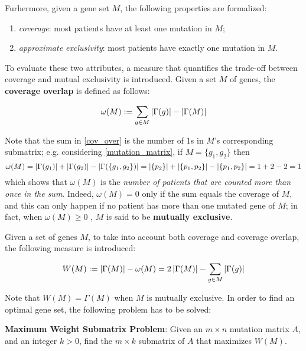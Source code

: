 Furhermore, given a gene set $M$, the following properties are formalized:

\begin{enumerate}[label=\roman*), font=\itshape]
    \item \textit{coverage}: most patients have at least one mutation in $M$;
    \item \textit{approximate exclusivity}: most patients have exactly one mutation in $M$.
\end{enumerate}

To evaluate these two attributes, a measure that quantifies the trade-off between coverage and mutual exclusivity is introduced. Given a set $M$ of genes, the \textbf{coverage overlap} is defined as follows:

\begin{equation}\label{cov_over}
    \omega(M) := \sum_{g \in M}{\left|\Gamma(g)\right|} - \left|\Gamma(M)\right|
\end{equation}

Note that the sum in \cref{cov_over} is the number of 1s in $M$'s corresponding submatrix; e.g. considering \cref{mutation_matrix}, if $M=\{g_1, g_2\}$ then $$\omega(M)=\left|\Gamma(g_1)\right| + \left|\Gamma(g_2)\right| - \left|\Gamma(\{g_1, g_2\})\right| = \left|\{p_2\}\right| + \left|\{p_1, p_2\}\right| - \left|\{p_1, p_2\}\right| = 1 + 2 - 2 = 1$$ which shows that $\omega(M)$ is the \textit{number of patients that are counted more than once in the sum}. Indeed, $\omega(M) = 0$ only if the sum equals the coverage of $M$, and this can only happen if no patient has more than one mutated gene of $M$; in fact, when $\omega(M) \ge 0$ , $M$ is said to be \textbf{mutually exclusive}.

Given a set of genes $M$, to take into account both coverage and coverage overlap, the following measure is introduced:

\begin{equation}\label{weight}
    W(M): = \left|\Gamma(M)\right| - \omega(M) = 2 \left|\Gamma(M)\right| - \sum_{g \in M} {\left|\Gamma(g)\right|}
\end{equation}

Note that $W(M) = \Gamma(M)$ when $M$ is mutually exclusive. In order to find an optimal gene set, the following problem has to be solved:

\begin{displayquote}
    \textbf{Maximum Weight Submatrix Problem}: Given an $m \times n$ mutation matrix $A$, and an integer $k > 0$, find the $m \times k$ submatrix of $A$ that maximizes $W(M)$.
\end{displayquote}

